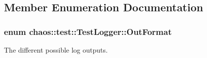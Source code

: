 \subsection{Member Enumeration Documentation}
\hypertarget{classchaos_1_1test_1_1_test_logger_a8e6f679501d623e41ac0f0c445a7820d}{
\subsubsection[{Out\-Format}]{\setlength{\rightskip}{0pt plus 5cm}enum {\bf chaos\-::test\-::\-Test\-Logger\-::\-Out\-Format}}}\label{classchaos_1_1test_1_1_test_logger_a8e6f679501d623e41ac0f0c445a7820d}


The different possible log outputs. 

